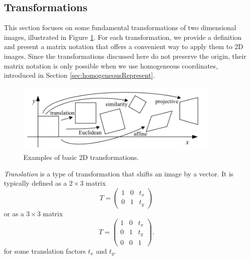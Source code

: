 \documentclass[11pt, oneside, reqno]{book}
\begin{document}
\subsection{Transformations}
\label{ssec:transformations}

This section focuses on some fundamental transformations of two dimensional images, illustrated in Figure \ref{fig:2dTransformations}. For each transformation, we provide a definition and present a matrix notation that offers a convenient way to apply them to 2D images. Since the transformations discussed here do not preserve the origin, their matrix notation is only possible when we use homogeneous coordinates, introduced in Section \ref{sec:homogeneousRepresent}.

\begin{figure}[h]
	\centering
	\includegraphics[width=0.9\textwidth]{data/2Dtransformations}
	\caption{Examples of basic 2D transformations. \cite{szeliski2010computer}}
	\label{fig:2dTransformations}
\end{figure}

\begin{definition}%
	\label{def:translation}
	\textit{Translation} is a type of transformation that shifts an image by a vector. It is typically defined as a $2\times3$ matrix 
	\[
	T = \begin{pmatrix}
	1 & 0 & t_x \\
	0 & 1 & t_y
	\end{pmatrix}
	\]
	or as a $3\times3$ matrix
	\[ 
	T = \begin{pmatrix}
	1 & 0 & t_x \\
	0 & 1 & t_y \\
	0 & 0 & 1
	\end{pmatrix}.
	\]
	for some translation factors $t_x$ and $t_y$.
\end{definition}
\end{document}
